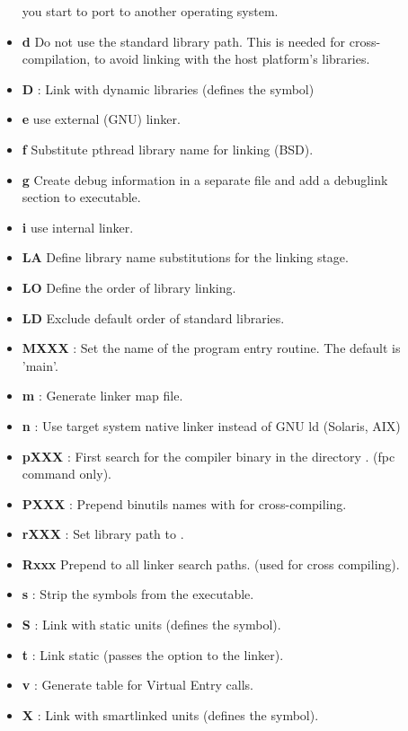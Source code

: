 \begin{description}
\begin{itemize}
  you start to port \fpc to another operating system. 
\item \textbf{d} Do not use the standard library path. This is needed for
cross-compilation, to avoid linking with the host platform's libraries.
\item \textbf{D} : Link with dynamic libraries (defines the
 symbol) 
\item \textbf{e} use external (GNU) linker.
\item \textbf{f}  Substitute pthread library name for linking (BSD).
\item \textbf{g} Create debug information in a separate file and add a debuglink section to executable.
\item \textbf{i} use internal linker.
\item \textbf{LA}  Define library name substitutions for the linking stage.
\item \textbf{LO}  Define the order of library linking.
\item \textbf{LD}  Exclude default order of standard libraries.
 \item \textbf{MXXX} : Set the name of the program entry routine.
The default is 'main'.
\item \textbf{m} : Generate linker map file.
\item \textbf{n} : Use target system native linker instead of GNU ld (Solaris, AIX) 
\item \textbf{pXXX} :   First search for the compiler binary in the directory .  (fpc command only).
\item \textbf{PXXX} : Prepend binutils names with   for cross-compiling.
\item \textbf{rXXX} : Set library path to .
\item \textbf{Rxxx} Prepend  to all linker search paths. (used for
cross compiling).
\item \textbf{s} : Strip the symbols from the executable. 
\item \textbf{S} : Link with static units (defines the  symbol).
\item \textbf{t} : Link static (passes the  option to the linker). 
\item \textbf{v} : Generate table for Virtual Entry calls.
\item \textbf{X} : Link with smartlinked units (defines the  symbol). 
\end{itemize}
\end{description}

